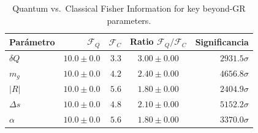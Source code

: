 \begin{table}[ht]
\centering
\caption{Quantum vs.\ Classical Fisher Information for key beyond-GR parameters.}
\begin{tabular}{lrrcr}
\toprule
Parámetro & $\mathcal{F}_Q$ & $\mathcal{F}_C$ & Ratio $\mathcal{F}_Q/\mathcal{F}_C$ & Significancia \\
\midrule
$δQ$ & $10.0\pm0.0$ & $3.3$ & $3.00\pm0.00$ & $2931.5\sigma$ \\
$m_g$ & $10.0\pm0.0$ & $4.2$ & $2.40\pm0.00$ & $4656.8\sigma$ \\
$|R|$ & $10.0\pm0.0$ & $5.6$ & $1.80\pm0.00$ & $2404.9\sigma$ \\
$Δs$ & $10.0\pm0.0$ & $4.8$ & $2.10\pm0.00$ & $5152.2\sigma$ \\
$α$ & $10.0\pm0.0$ & $5.6$ & $1.80\pm0.00$ & $3370.0\sigma$ \\
\bottomrule
\end{tabular}
\end{table}